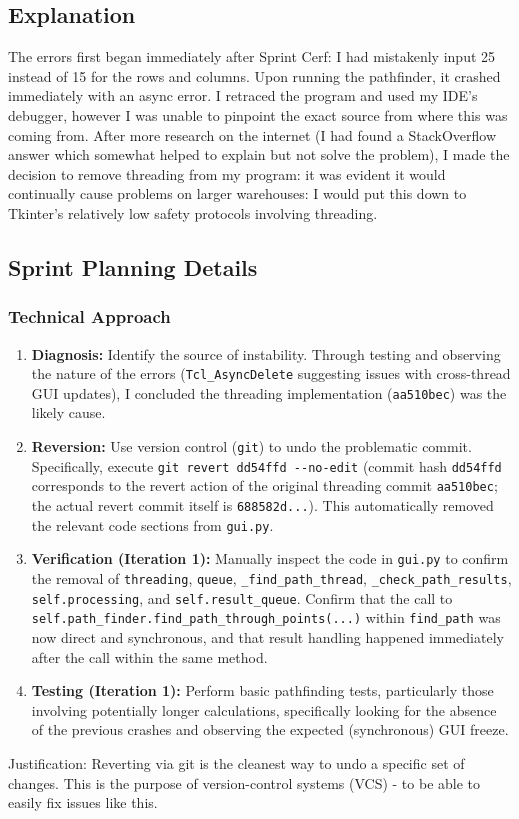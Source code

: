 \subsection{Explanation}

The errors first began immediately after Sprint Cerf: I had mistakenly input 25 instead of 15 for the rows and columns. Upon running the pathfinder, it crashed immediately with an async error. I retraced the program and used my IDE's debugger, however I was unable to pinpoint the exact source from where this was coming from. After more research on the internet (I had found a StackOverflow answer which somewhat helped to explain but not solve the problem), I made the decision to remove threading from my program: it was evident it would continually cause problems on larger warehouses: I would put this down to Tkinter's relatively low safety protocols involving threading.

\clearpage
\subsection{Sprint Planning Details}

\subsubsection{Technical Approach}
\begin{enumerate}
	\item \textbf{Diagnosis:} Identify the source of instability. Through testing and observing the nature of the errors (\verb|Tcl_AsyncDelete| suggesting issues with cross-thread GUI updates), I concluded the threading implementation (\verb|aa510bec|) was the likely cause.
	\item \textbf{Reversion:} Use version control (\verb|git|) to undo the problematic commit. Specifically, execute \verb|git revert dd54ffd --no-edit| (commit hash \verb|dd54ffd| corresponds to the revert action of the original threading commit \verb|aa510bec|; the actual revert commit itself is \verb|688582d...|). This automatically removed the relevant code sections from \verb|gui.py|.
	\item \textbf{Verification (Iteration 1):} Manually inspect the code in \verb|gui.py| to confirm the removal of \verb|threading|, \verb|queue|, \verb|_find_path_thread|, \verb|_check_path_results|, \verb|self.processing|, and \verb|self.result_queue|. Confirm that the call to \verb|self.path_finder.find_path_through_points(...)| within \verb|find_path| was now direct and synchronous, and that result handling happened immediately after the call within the same method.
	\item \textbf{Testing (Iteration 1):} Perform basic pathfinding tests, particularly those involving potentially longer calculations, specifically looking for the absence of the previous crashes and observing the expected (synchronous) GUI freeze.
\end{enumerate}
Justification: Reverting via git is the cleanest way to undo a specific set of changes. This is the purpose of version-control systems (VCS) - to be able to easily fix issues like this.

